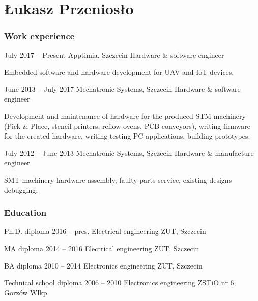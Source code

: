 \documentclass{tccv}
\begin{document}
\part{Łukasz Przeniosło}

\section{Work experience}

\begin{eventlist}

\item{July 2017 -- Present}
     {Apptimia, Szczecin}
     {Hardware \& software engineer}
     
Embedded software and hardware development for UAV and IoT devices.

\item{June 2013 -- July 2017}
     {Mechatronic Systems, Szczecin}
     {Hardware \& software engineer}
     
Development and maintenance of hardware for the produced STM machinery (Pick \& Place, stencil printers, reflow ovens, PCB conveyors), writing firmware for the created hardware, writing testing PC applications, building prototypes. 

\item{July 2012 -- June 2013}
     {Mechatronic Systems, Szczecin}
     {Hardware \& manufacture engineer}

SMT machinery hardware assembly, faulty parts service, existing designs debugging. 

\end{eventlist}

\section{Education}

\begin{yearlist}

\item[Ph.D. diploma]{2016 -- pres.}
     {Electrical engineering}
     {ZUT, Szczecin}

\item[MA diploma]{2014 -- 2016}
     {Electrical engineering}
     {ZUT, Szczecin}

\item[BA diploma]{2010 -- 2014}
     {Electronics engineering}
     {ZUT, Szczecin}

\item[Technical school diploma]{2006 -- 2010}
     {Electronics engineering}
     {ZSTiO nr 6, Gorzów Wlkp}

\end{yearlist}
\end{document}
